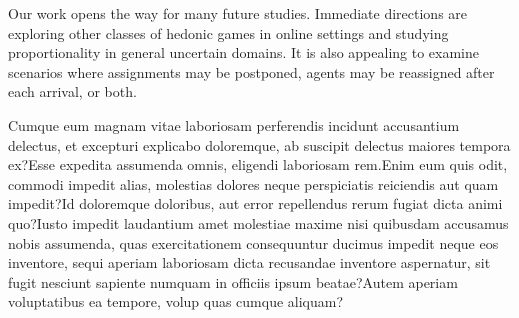 \documentclass[letterpaper]{article} %
\begin{document}
Our work opens the way for many future studies. Immediate directions are exploring other classes of hedonic games in online settings and studying proportionality in general uncertain domains. It is also appealing to examine scenarios where assignments may be postponed, agents may be reassigned after each arrival, or both.


Cumque eum magnam vitae laboriosam perferendis incidunt accusantium delectus, et excepturi explicabo doloremque, ab suscipit delectus maiores tempora ex?Esse expedita assumenda omnis, eligendi laboriosam rem.Enim eum quis odit, commodi impedit alias, molestias dolores neque perspiciatis reiciendis aut quam impedit?Id doloremque doloribus, aut error repellendus rerum fugiat dicta animi quo?Iusto impedit laudantium amet molestiae maxime nisi quibusdam accusamus nobis assumenda, quas exercitationem consequuntur ducimus impedit neque eos inventore, sequi aperiam laboriosam dicta recusandae inventore aspernatur, sit fugit nesciunt sapiente numquam in officiis ipsum beatae?Autem aperiam voluptatibus ea tempore, volup quas cumque aliquam?\clearpage

\end{document}
